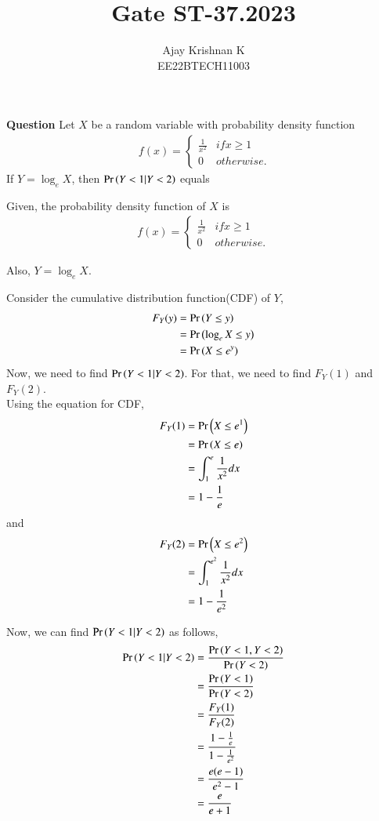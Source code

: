 \documentclass[journal,11pt]{IEEEtran}
\begin{document}
\vspace{3cm}
\author{Ajay Krishnan K\\EE22BTECH11003}

\title{Gate ST-37.2023}
\maketitle

\textbf{Question}
Let $X$ be a random variable with probability density function
\begin{align}\
    f(x) = \begin{cases}
        \frac{1}{x^2} & if x \geq 1\\
        0  & otherwise.
        \end{cases}
\end{align}
If $Y = \log_e X$, then $\Pr\left(Y<1 | Y<2 \right)$ equals

\solution

Given, the probability density function of $X$ is
\begin{align}
    f(x) = \begin{cases}
        \frac{1}{x^2} & if x \geq 1\\
        0  & otherwise.
        \end{cases}
\end{align}

Also, $Y = \log_e X$.

Consider the cumulative distribution function(CDF) of $Y$,
\begin{align}
    F_Y(y) &= \Pr\left(Y \leq y\right)\\
    &= \Pr\left(\log_e X \leq y\right)\\
    &= \Pr\left(X \leq e^y\right)
\end{align}
Now, we need to find $\Pr\left(Y<1 | Y<2 \right)$.
For that, we need to find $F_Y(1)$ and $F_Y(2)$.\\
Using the equation for CDF,
\begin{align}
    F_Y(1) &= \Pr\left(X \leq e^1\right)\\
    &= \Pr\left(X \leq e\right)\\
    &= \int_{1}^{e} \frac{1}{x^2} dx\\
    &= 1 - \frac{1}{e}
\end{align}
and
\begin{align}
    F_Y(2) &= \Pr\left(X \leq e^2\right)\\
    &= \int_{1}^{e^2} \frac{1}{x^2} dx\\
    &= 1 - \frac{1}{e^2}
\end{align}

Now, we can find $\Pr\left(Y<1 | Y<2 \right)$ as follows,
\begin{align}
    \Pr\left(Y<1 | Y<2 \right) &= \frac{\Pr\left(Y<1 , Y<2\right)}{\Pr\left(Y<2\right)}\\
    &= \frac{\Pr\left(Y<1\right)}{\Pr\left(Y<2\right)}\\
    &= \frac{F_Y(1)}{F_Y(2)}\\
    &= \frac{1 - \frac{1}{e}}{1 - \frac{1}{e^2}}\\
    &= \frac{e(e-1)}{e^2-1}\\
    &= \frac{e}{e+1}
\end{align}
\end{document}
